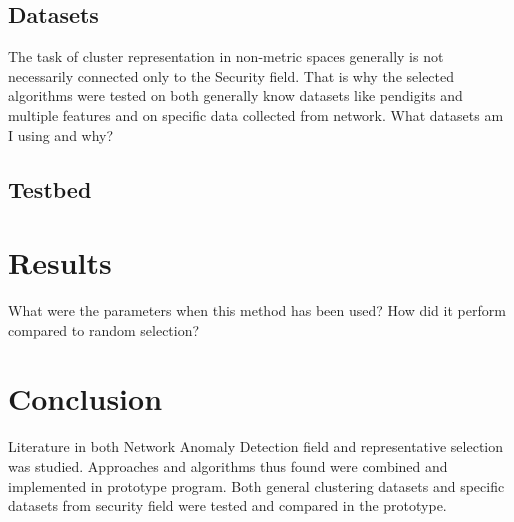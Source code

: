 \documentclass[thesis=B,english]{FITthesis}[2012/10/20]
\begin{document}

\section{Datasets}
The task of cluster representation in non-metric spaces generally is not necessarily connected only to the Security field.
That is why the selected algorithms were tested on both generally know datasets like pendigits and multiple features and on specific data collected from network.
What datasets am I using and why?

\section{Testbed}

\chapter{Results}

What were the parameters when this method has been used?
How did it perform compared to random selection?


\chapter{Conclusion}
Literature in both Network Anomaly Detection field and representative selection was studied.
Approaches and algorithms thus found were combined and implemented in prototype program.
Both general clustering datasets and specific datasets from security field were tested and compared in the prototype. \\ 
\end{document}

